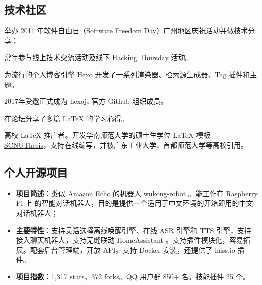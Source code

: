 \newpage

\subsection{\hei 技术社区}

{
  \begin{tightitemize}%
  \item 举办 2011 年软件自由日（Software Freedom Day）广州地区庆祝活动并做技术分享；
  \item 常年参与线上技术交流活动及线下 Hacking Thursday 活动。
  \end{tightitemize}}

{
  \begin{tightitemize}%
  \item 为流行的个人博客引擎 Hexo 开发了一系列渲染器、检索源生成器、Tag 插件和主题。
  \item 2017年受邀正式成为 hexojs 官方 Github 组织成员。
  \end{tightitemize}}

{
  \begin{tightitemize}%
  \item 在论坛分享了多篇 \LaTeX{} 的学习心得。
  \item 高校 \LaTeX{} 推广者。开发华南师范大学的硕士生学位 \LaTeX{} 模板
    \href{https://github.com/scnu/scnuthesis}{SCNUThesis}，支持在线编写，并被广东工业大学、首都师范大学等高校引用。
  \end{tightitemize}}

\subsection{\hei 个人开源项目}

%
  {
\begin{itemize}
\item \textbf{项目简述}：类似 Amazon Echo 的机器人 wukong-robot 。能工作在 Raspberry Pi 上
  的智能对话机器人，目的是提供一个适用于中文环境的开箱即用的中文对话机器人；
\item \textbf{主要特性}：支持灵活选择离线唤醒引擎、在线 ASR 引擎和 TTS 引擎，支持
  接入聊天机器人，支持无缝联动 HomeAssistant 。支持插件模块化，容易拓展。配套后台管理端，开放 API。支持 Docker 安装，还提供了 hass.io 插件。
\item \textbf{项目指数}：1,317 stars，372 forks。QQ 用户群 850+ 名。技能插件 25 个。
\end{itemize}}

